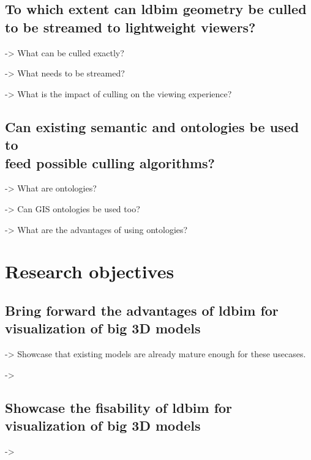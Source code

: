 \subsection[Can \acs{ldbim} be culled?]{To which extent can \acs{ldbim} geometry be culled\\
    to be streamed to lightweight viewers?}
-> What can be culled exactly?

-> What needs to be streamed?

-> What is the impact of culling on the viewing experience?

\subsection[Can existing semantic be used?]{Can existing semantic and ontologies be used to\\
    feed possible culling algorithms?}
-> What are ontologies?

-> Can GIS ontologies be used too?

-> What are the advantages of using ontologies?

\section{Research objectives}
\subsection[Advantages of LDBIM]{Bring forward the advantages of \acs{ldbim} for visualization of big 3D models}
-> Showcase that existing models are already mature enough for these usecases.

-> 
\subsection[Showcase the fisability]{Showcase the fisability of \acs{ldbim} for visualization of big 3D models}
-> 